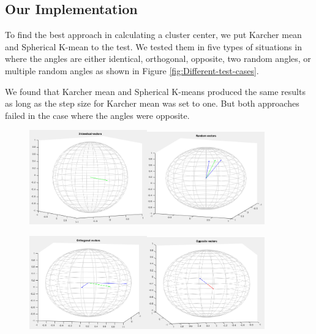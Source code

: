 \documentclass[../tech_report_1.tex]{subfiles}
\begin{document}
\subsection{Our Implementation}

To find the best approach in calculating a cluster center, we put
Karcher mean and Spherical K-mean to the test. We tested them in five
types of situations in where the angles are either identical, orthogonal,
opposite, two random angles, or multiple random angles as shown in
Figure \ref{fig:Different-test-cases}. 

We found that Karcher mean and Spherical K-means produced the same
results as long as the step size for Karcher mean was set to one.
But both approaches failed in the case where the angles were opposite. 

\begin{figure}[ht]
\begin{centering}
\includegraphics[width=2in]{fig1}\includegraphics[width=2in]{fig2} 
\par\end{centering}

\begin{centering}
\includegraphics[width=2in]{fig3}\includegraphics[width=2in]{fig4}
\par\end{centering}


\end{figure}
\end{document}

